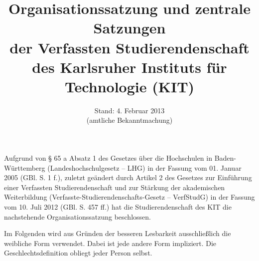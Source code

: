 \documentclass[
	a4paper,
	parskip=half,
	numbers=noenddot,
	titlepage,
	DIV=12,
]{scrartcl}
\title{Organisationssatzung und zentrale Satzungen\\der Verfassten Studierendenschaft\\des Karlsruher Instituts für Technologie (KIT)}
\author{}
\date{Stand: 4. Februar 2013\\(amtliche Bekanntmachung)}
\makeatletter
\newcommand*{\setpartpreamble}[1]{\def\@partpreamble{#1}}
\makeatother
\begin{document}
\maketitle

\cleardoublepage

\begin{multicols}{2}
\tableofcontents
\end{multicols}

\bigskip

Aufgrund von § 65 a Absatz 1 des Gesetzes über die Hochschulen in Baden-Württemberg (Landeshochschulgesetz -- LHG) in der Fassung vom 01. Januar 2005 (GBl. S. 1 f.), zuletzt geändert durch Artikel 2 des Gesetzes zur Einführung einer Verfassten Studierendenschaft und zur Stärkung der akademischen Weiterbildung (Verfasste-Studierendenschafts-Gesetz -- VerfStudG) in der Fassung vom 10. Juli 2012 (GBl. S. 457 ff.) hat die Studierendenschaft des KIT die nachstehende Organisationssatzung beschlossen.

Im Folgenden wird aus Gründen der besseren Lesbarkeit ausschließlich die weibliche Form verwendet. Dabei ist jede andere Form impliziert. Die Geschlechtsdefinition obliegt jeder Person selbst.


\makeatletter
\newcommand*{\@stupadate}{Noch nicht beschlossen}
\newcommand*{\@publishdate}{Noch nicht veröffentlicht}
\newcommand*{\@jurchanges}{Noch nicht veröffentlicht}
\newcommand*{\stupadate}[1]{\renewcommand*{\@stupadate}{#1}}
\newcommand*{\publishdate}[1]{\renewcommand*{\@publishdate}{#1}}
\newcommand*{\jurchanges}[1]{\renewcommand*{\@jurchanges}{Eingearbeitete Änderungen:\begin{itemize}#1\end{itemize}}}


\newcommand{\jurtitle}[2][]{%
\ifthenelse{\isempty{#1}}{\def\shorttitle{#2}}{\def\shorttitle{#1}}%
\setpartpreamble{%
	\begin{center}
		\Large
		\begin{tabular}{ll}
		Beschluss: & \@stupadate \\
		Veröffentlichung: & \@publishdate \\
		\end{tabular}
	\end{center}
	\vfil
	\@jurchanges
}
\part[\shorttitle]{#2}
}
\end{document}
